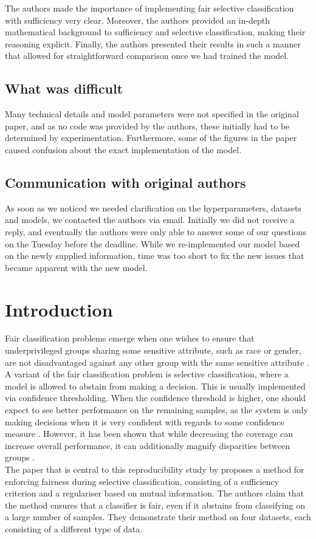The authors made the importance of implementing fair selective classification with sufficiency very clear. Moreover, the authors provided an in-depth mathematical background to sufficiency and selective classification, making their reasoning explicit. Finally, the authors presented their results in such a manner that allowed for straightforward comparison once we had trained the model.

\subsection*{What was difficult}

Many technical details and model parameters were not specified in the original paper, and as no code was provided by the authors, these initially had to be determined by experimentation. Furthermore, some of the figures in the paper caused confusion about the exact implementation of the model.


\subsection*{Communication with original authors}
As soon as we noticed we needed clarification on the hyperparameters, datasets and models, we contacted the authors via email. Initially we did not receive a reply, and eventually the authors were only able to answer some of our questions on the Tuesday before the deadline. While we re-implemented our model based on the newly supplied information, time was too short to fix the new issues that became apparent with the new model.

\newpage
\section{Introduction}

Fair classification problems emerge when one wishes to ensure that underprivileged groups sharing some sensitive attribute, such as race or gender, are not disadvantaged against any other group with the same sensitive attribute \citep{lee2021fair}. A variant of the fair classification problem is selective classification, where a model is allowed to abstain from making a decision. This is usually implemented via confidence thresholding. When the confidence threshold is higher, one should expect to see better performance on the remaining samples, as the system is only making decisions when it is very confident with regards to some confidence measure \citep{jones2020selective}. However, it has been shown that while decreasing the coverage can increase overall performance, it can additionally magnify disparities between groups \citep{jones2020selective}. \\
The paper that is central to this reproducibility study by \citet{lee2021fair} proposes a method for enforcing fairness during selective classification, consisting of a sufficiency criterion and a regulariser based on mutual information. The authors claim that the method ensures that a classifier is fair, even if it abstains from classifying on a large number of samples. They demonstrate their method on four datasets, each consisting of a different type of data.


